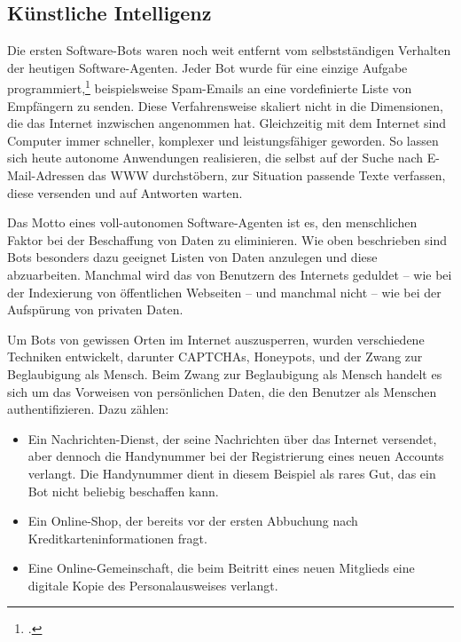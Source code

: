 \subsection{Künstliche Intelligenz}
\label{sub:kunstliche_intelligenz}

Die ersten Software-Bots waren noch weit entfernt vom selbstständigen Verhalten
der heutigen Software-Agenten. Jeder Bot wurde für eine einzige Aufgabe
programmiert,\footcite{wa:spamFilter} beispielsweise Spam-Emails an eine
vordefinierte Liste von Empfängern zu senden. Diese Verfahrensweise skaliert
nicht in die Dimensionen, die das Internet inzwischen angenommen hat.
Gleichzeitig mit dem Internet sind Computer immer schneller, komplexer und
leistungsfähiger geworden. So lassen sich heute autonome Anwendungen
realisieren, die selbst auf der Suche nach E-Mail-Adressen das WWW
durchstöbern, zur Situation passende Texte verfassen, diese versenden und auf
Antworten warten.

Das Motto eines voll-autonomen Software-Agenten ist es, den menschlichen Faktor
bei der Beschaffung von Daten zu eliminieren. Wie oben beschrieben sind Bots
besonders dazu geeignet Listen von Daten anzulegen und diese abzuarbeiten.
Manchmal wird das von Benutzern des Internets geduldet -- wie bei der
Indexierung von öffentlichen Webseiten -- und manchmal nicht -- wie bei der
Aufspürung von privaten Daten.

Um Bots von gewissen Orten im Internet auszusperren, wurden verschiedene
Techniken entwickelt, darunter CAPTCHAs,
Honeypots, und der Zwang zur Beglaubigung als Mensch.
Beim Zwang zur Beglaubigung als Mensch handelt es sich um das Vorweisen von
persönlichen Daten, die den Benutzer als Menschen authentifizieren. Dazu zählen:

\begin{itemize}
\item
  Ein Nachrichten-Dienst, der seine Nachrichten über das Internet versendet,
  aber dennoch die Handynummer bei der Registrierung eines neuen Accounts
  verlangt. Die Handynummer dient in diesem Beispiel als rares Gut, das ein Bot
  nicht beliebig beschaffen kann.
\item
  Ein Online-Shop, der bereits vor der ersten Abbuchung nach
  Kreditkarteninformationen fragt.
\item
  Eine Online-Gemeinschaft, die beim Beitritt eines neuen Mitglieds eine
  digitale Kopie des Personalausweises verlangt.
\end{itemize}

